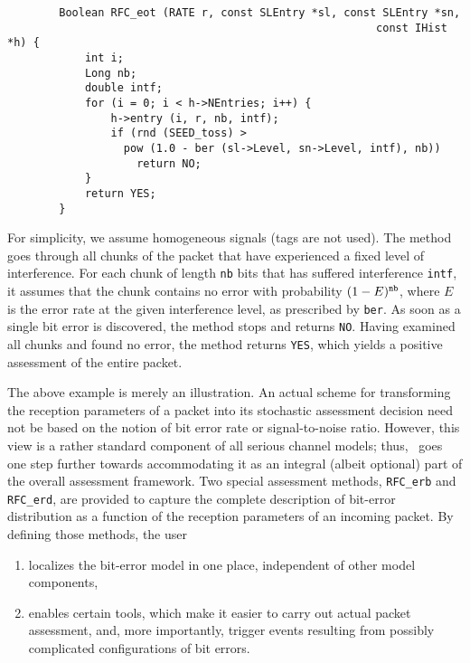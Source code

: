 \begin{verbatim}
        Boolean RFC_eot (RATE r, const SLEntry *sl, const SLEntry *sn,
                                                         const IHist *h) {
            int i;
            Long nb;
            double intf;
            for (i = 0; i < h->NEntries; i++) {
                h->entry (i, r, nb, intf);
                if (rnd (SEED_toss) >
                  pow (1.0 - ber (sl->Level, sn->Level, intf), nb))
                    return NO;
            }
            return YES;
        }
\end{verbatim}

\noindent
For simplicity, we assume homogeneous signals (tags are not used).
The method goes through all chunks of the packet that have experienced a fixed
level of interference.
For each chunk of length {\tt nb} bits that has suffered interference
{\tt intf}, it assumes that the chunk contains no error with probability
$(1-E)^{\tt nb}$, where $E$ is the error rate at the given interference level,
as prescribed by {\tt ber}.
As soon as a single bit error is discovered, the method stops and returns
{\tt NO}.
Having examined all chunks and found no error, the method returns {\tt YES},
which yields a positive assessment of the entire packet.

\medskip

The above example is merely an illustration.
An actual scheme for transforming the reception parameters of a packet
into its stochastic assessment decision need not be based on the notion
of bit error rate or signal-to-noise ratio.
However, this view is a rather standard component of all serious channel
models; thus, \smurph\ goes one step further towards accommodating it
as an integral (albeit optional) part of the overall assessment framework.
Two special assessment methods, {\tt RFC\_erb} and {\tt RFC\_erd}, are
provided to capture the complete description of bit-error distribution as
a function of the reception parameters of an incoming packet.
By defining those methods, the user

\begin{enumerate}
\item
localizes the bit-error model in one place, independent of other
model components,
\item
enables certain tools, which make it easier to carry out actual packet
assessment, and, more importantly, trigger events resulting from possibly
complicated configurations of bit errors.
\end{enumerate}

